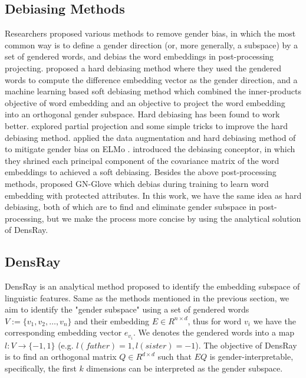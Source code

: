 \subsection{Debiasing Methods}
Researchers proposed various methods to remove gender bias, in which the most common way is to define a gender direction (or, more generally, a subspace) by a set of gendered words, and debias the word embeddings in post-processing projecting. \citet{bolukbasi2016man} proposed a hard debiasing method where they used the gendered words to compute the difference embedding vector as the gender direction, and a machine learning based soft debiasing method which combined the inner-products objective of word embedding and an objective to project the word embedding into an orthogonal gender subspace. Hard debiasing has been found to work better. \citet{dev2019attenuating} explored partial projection and some simple tricks to improve the hard debiasing method. \citet{zhao2019gender} applied the data augmentation and hard debiasing method of \citet{bolukbasi2016man} to mitigate gender bias on ELMo \citep{Peters:2018}. \citet{karve2019conceptor} introduced the debiasing conceptor, in which they shrined each principal component of the covariance matrix of the word embeddings to achieved a soft debiasing. Besides the above post-processing methods, \citep{zhao2018learning} proposed GN-Glove which debias during training to learn word embedding with protected attributes. In this work, we have the same idea as hard debiasing, both of which are to find and eliminate gender subspace in post-processing, but we make the process more concise by using the analytical solution of DensRay.

\subsection{DensRay}
DensRay is an analytical method proposed to identify the embedding subspace of linguistic features. Same as the methods mentioned in the previous section, we aim to identify the "gender subspace" using a set of gendered words $V:=\{v_1,v_2,\dots,v_n\}$ and their embedding $E \in R^{n\times d}$, thus for word $v_i$ we have the corresponding embedding vector $e_{v_i}$. We denotes the gendered words into a map $l:V\to \{-1,1\}$ (e.g. $l(father)=1,l(sister)=-1$). The objective of DensRay is to find an orthogonal matrix $Q\in R^{d\times d}$ such that $EQ$ is gender-interpretable, specifically, the first $k$ dimensions can be interpreted as the gender subspace.

